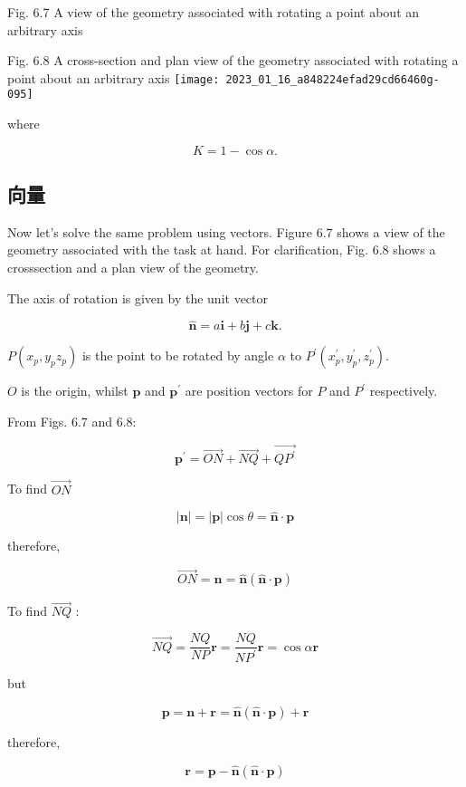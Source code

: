 Fig. 6.7 A view of the geometry associated with rotating a point about an arbitrary axis

Fig. 6.8 A cross-section and plan view of the geometry associated with rotating a point about an arbitrary axis
\texttt{[image: 2023\_01\_16\_a848224efad29cd66460g-095]}

where

$$
K=1-\cos \alpha .
$$

\subsection{向量}
Now let's solve the same problem using vectors. Figure $6.7$ shows a view of the geometry associated with the task at hand. For clarification, Fig. $6.8$ shows a crosssection and a plan view of the geometry.

The axis of rotation is given by the unit vector

$$
\hat{\mathbf{n}}=a \mathbf{i}+b \mathbf{j}+c \mathbf{k} .
$$

$P\left(x_{p}, y_{p} z_{p}\right)$ is the point to be rotated by angle $\alpha$ to $P^{\prime}\left(x_{p}^{\prime}, y_{p}^{\prime}, z_{p}^{\prime}\right)$.

$O$ is the origin, whilst $\mathbf{p}$ and $\mathbf{p}^{\prime}$ are position vectors for $P$ and $P^{\prime}$ respectively.

From Figs. $6.7$ and 6.8:

$$
\mathbf{p}^{\prime}=\overrightarrow{O N}+\overrightarrow{N Q}+\overrightarrow{Q P^{\prime}}
$$

To find $\overrightarrow{O N}$

$$
|\mathbf{n}|=|\mathbf{p}| \cos \theta=\hat{\mathbf{n}} \cdot \mathbf{p}
$$

therefore,

$$
\overrightarrow{O N}=\mathbf{n}=\hat{\mathbf{n}}(\hat{\mathbf{n}} \cdot \mathbf{p})
$$

To find $\overrightarrow{N Q}$ :

$$
\overrightarrow{N Q}=\frac{N Q}{N P} \mathbf{r}=\frac{N Q}{N P^{\prime}} \mathbf{r}=\cos \alpha \mathbf{r}
$$

but

$$
\mathbf{p}=\mathbf{n}+\mathbf{r}=\hat{\mathbf{n}}(\hat{\mathbf{n}} \cdot \mathbf{p})+\mathbf{r}
$$

therefore,

$$
\mathbf{r}=\mathbf{p}-\hat{\mathbf{n}}(\hat{\mathbf{n}} \cdot \mathbf{p})
$$

